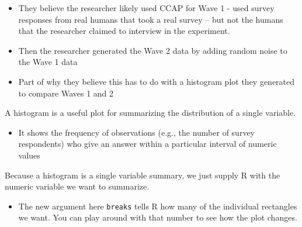 \documentclass[
  letterpaper,
  DIV=11,
  numbers=noendperiod]{scrreprt}
\newenvironment{Shaded}{\begin{snugshade}}{\end{snugshade}}
\newcommand{\AttributeTok}[1]{\textcolor[rgb]{0.40,0.45,0.13}{#1}}
\newcommand{\DecValTok}[1]{\textcolor[rgb]{0.68,0.00,0.00}{#1}}
\newcommand{\FunctionTok}[1]{\textcolor[rgb]{0.28,0.35,0.67}{#1}}
\newcommand{\NormalTok}[1]{\textcolor[rgb]{0.00,0.23,0.31}{#1}}
\newcommand{\SpecialCharTok}[1]{\textcolor[rgb]{0.37,0.37,0.37}{#1}}
\newcommand{\StringTok}[1]{\textcolor[rgb]{0.13,0.47,0.30}{#1}}
\providecommand{\tightlist}{%
  \setlength{\itemsep}{0pt}\setlength{\parskip}{0pt}}\usepackage{longtable,booktabs,array}
\begin{document}
\begin{itemize}
\tightlist
\item
  They believe the researcher likely used CCAP for Wave 1 - used survey
  responses from real humans that took a real survey -- but not the
  humans that the researcher claimed to interview in the experiment.
\item
  Then the researcher generated the Wave 2 data by adding random noise
  to the Wave 1 data
\item
  Part of why they believe this has to do with a histogram plot they
  generated to compare Waves 1 and 2
\end{itemize}

A histogram is a useful plot for summarizing the distribution of a
single variable.

\begin{itemize}
\tightlist
\item
  It shows the frequency of observations (e.g., the number of survey
  respondents) who give an answer within a particular interval of
  numeric values
\end{itemize}

Because a histogram is a single variable summary, we just supply R with
the numeric variable we want to summarize.

\begin{itemize}
\tightlist
\item
  The new argument here \texttt{breaks} tells R how many of the
  individual rectangles we want. You can play around with that number to
  see how the plot changes.
\end{itemize}

\begin{Shaded}
\end{Shaded}
\end{document}

